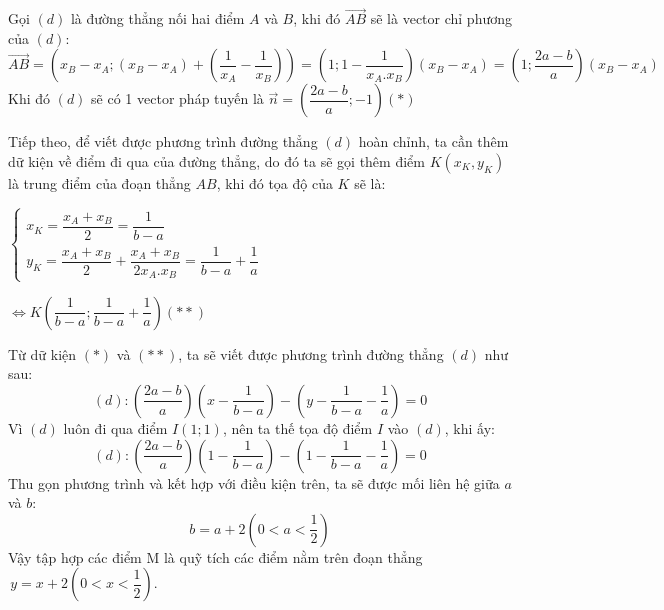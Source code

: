 \documentclass[12pt, a4paper]{article}
\begin{document}
Gọi $ (d) $ là đường thẳng nối hai điểm $A$ và $B$, khi đó $\overrightarrow{AB} $ sẽ là vector chỉ phương của $ (d) $: $$ \overrightarrow{AB} = \left(x_B - x_A; (x_B - x_A) + \left(\dfrac{1}{x_A} - \dfrac{1}{x_B} \right) \right) = \left(1; 1 - \dfrac{1}{x_A.x_B}\right) (x_B - x_A ) = \left(1;\dfrac{2a - b}{a}\right)(x_B - x_A)$$
Khi đó $(d)$ sẽ có 1 vector pháp tuyến là $ \vec{n} = \left( \dfrac{2a - b}{a}; -1\right) (*) $ 

\pagebreak

Tiếp theo, để viết được phương trình đường thẳng $(d)$ hoàn chỉnh, ta cần thêm dữ kiện về điểm đi qua của đường thẳng, do đó ta sẽ gọi thêm điểm $ K(x_K, y_K) $ là trung điểm của đoạn thẳng $ AB $, khi đó tọa độ của $ K $ sẽ là: 

\begin{minipage}{0.5\textwidth}  
\begin{flushright}
	$
	\begin{cases}
	    x_K = \dfrac{x_A + x_B}{2} = \dfrac{1}{b - a} \\
	    y_K = \dfrac{x_A + x_B}{2} + \dfrac{x_A + x_B}{2x_A.x_B} = \dfrac{1}{b - a} + \dfrac{1}{a}
	\end{cases}
	$
\end{flushright}
\end{minipage}
\begin{minipage}{0.5\textwidth}
	$
	\iff
		K\left(\dfrac{1}{b - a}; \dfrac{1}{b - a} + \dfrac{1}{a} \right) (**)
	$
\end{minipage}

Từ dữ kiện $ (*) $ và $ (**) $, ta sẽ viết được phương trình đường thẳng $ (d) $ như sau: $$(d): \left( \dfrac{2a - b}{a} \right) \left(x - \dfrac{1}{b - a}\right) - \left(y - \dfrac{1}{b - a} - \dfrac{1}{a} \right) = 0 $$
Vì $ (d) $ luôn đi qua điểm $I(1;1)$, nên ta thế tọa độ điểm $ I $ vào $ (d) $, khi ấy: $$(d): \left( \dfrac{2a - b}{a} \right) \left(1 - \dfrac{1}{b - a}\right) - \left(1 - \dfrac{1}{b - a} - \dfrac{1}{a} \right) = 0 $$
Thu gọn phương trình và kết hợp với điều kiện trên, ta sẽ được mối liên hệ giữa $ a $ và $ b $: $$ b = a + 2  \left(0 < a < \dfrac{1}{2} \right)$$
Vậy tập hợp các điểm M là quỹ tích các điểm nằm trên đoạn thẳng $ \, y = x + 2 \left( 0 < x < \dfrac{1}{2} \right) $.
\end{document}
